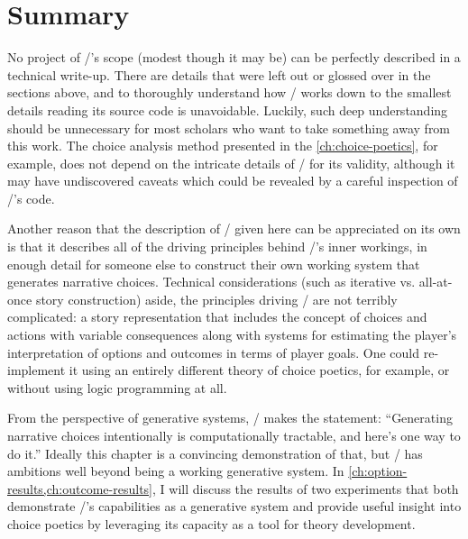 \section{Summary}

No project of \dunyazad/'s scope (modest though it may be) can be perfectly described in a technical write-up.
%
There are details that were left out or glossed over in the sections above, and to thoroughly understand how \dunyazad/ works down to the smallest details reading its source code is unavoidable.
%
%
Luckily, such deep understanding should be unnecessary for most scholars who want to take something away from this work.
%
The choice analysis method presented in the \cref{ch:choice-poetics}, for example, does not depend on the intricate details of \dunyazad/ for its validity, although it may have undiscovered caveats which could be revealed by a careful inspection of \dunyazad/'s code.


Another reason that the description of \dunyazad/ given here can be appreciated on its own is that it describes all of the driving principles behind \dunyazad/'s inner workings, in enough detail for someone else to construct their own working system that generates narrative choices.
%
Technical considerations (such as iterative vs\@. all-at-once story construction) aside, the principles driving \dunyazad/ are not terribly complicated: a story representation that includes the concept of choices and actions with variable consequences along with systems for estimating the player's interpretation of options and outcomes in terms of player goals.
%
One could re-implement it using an entirely different theory of choice poetics, for example, or without using logic programming at all.


From the perspective of generative systems, \dunyazad/ makes the statement: ``Generating narrative choices intentionally is computationally tractable, and here's one way to do it.''
%
Ideally this chapter is a convincing demonstration of that, but \dunyazad/ has ambitions well beyond being a working generative system.
%
In \cref{ch:option-results,ch:outcome-results}, I will discuss the results of two experiments that both demonstrate \dunyazad/'s capabilities as a generative system and provide useful insight into choice poetics by leveraging its capacity as a tool for theory development.

\label{sec:dunyazad-summary}%
